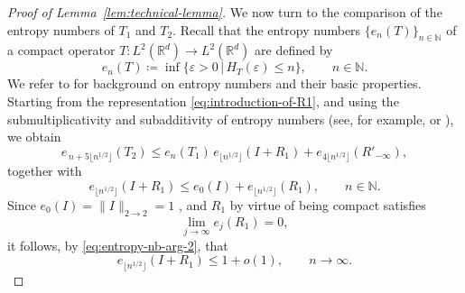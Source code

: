\documentclass[a4paper,12pt]{article}
\newcommand{\N}{\mathbb{N}}
\newcommand{\R}{\mathbb{R}}
\begin{document}
\begin{proof}[Proof of Lemma~\ref{lem:technical-lemma}]
We now turn to the comparison of the entropy numbers of $T_1$ and $T_2$.
Recall that the entropy numbers $\{e_n(T)\}_{n\in\N}$ of a compact operator
$T\colon L^2(\R^d)\to L^2(\R^d)$ are defined by
\begin{equation}\label{eq:def-entropy-nbs}
    e_n(T)
    \coloneqq
    \inf\bigl\{ \varepsilon>0 \,\big|\, H_T(\varepsilon)\le n \bigr\},
    \qquad n\in\N.
\end{equation}
We refer to
\cite{opideals1980pietsch,bookeigen1987pietsch,carlEntropyCompactnessApproximation1990,lorentzConstructiveApproximationAdvanced1996,edmundsFunctionSpacesEntropy1996}
for background on entropy numbers and their basic properties. Starting from the representation \eqref{eq:introduction-of-R1}, and using the
submultiplicativity and subadditivity of entropy numbers 
(see, for example,
\cite[Section~15.7]{lorentzConstructiveApproximationAdvanced1996} or
\cite[Section~1.3.1, Lemma~1%
]{edmundsFunctionSpacesEntropy1996}),
we obtain
\begin{equation}\label{eq:entropy-nb-arg-1}
    e_{\,n+5\lfloor n^{1/2}\rfloor}(T_2)
    \le
    e_n(T_1)\,e_{\lfloor n^{1/2}\rfloor}(I+R_1)
    +
    e_{4\lfloor n^{1/2}\rfloor}(R'_{-\infty}),
\end{equation}
together with
\begin{equation}\label{eq:entropy-nb-arg-2}
    e_{\lfloor n^{1/2}\rfloor}(I+R_1)
    \le
    e_{0}(I) + e_{\lfloor n^{1/2}\rfloor}(R_1),
    \qquad n\in\N.
\end{equation}
Since $e_{0}(I)=\|I\|_{2\to2}=1$ 
\cite[Section~15.7]{lorentzConstructiveApproximationAdvanced1996},
and $R_1$ by virtue of being compact satisfies
\[
\lim_{{j}\to\infty} e_{j}(R_1)=0,
\]
it follows, 
by \eqref{eq:entropy-nb-arg-2},
that
\begin{equation}\label{eq:bound-entropy-identity}
    e_{\lfloor n^{1/2}\rfloor}(I+R_1)
    \le
    1+o(1),
    \qquad n\to\infty.
\end{equation}




\end{proof}
\end{document}
